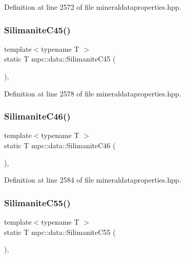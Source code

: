 Definition at line 2572 of file mineraldataproperties.\+hpp.

\mbox{\label{namespacempc_1_1data_a40198fd3de61005310799aee63c38616}} 
\subsubsection{\texorpdfstring{Silimanite\+C45()}{SilimaniteC45()}}
{\footnotesize\ttfamily template$<$typename T $>$ \\
static T mpc\+::data\+::\+Silimanite\+C45 (\begin{DoxyParamCaption}{ }\end{DoxyParamCaption})\hspace{0.3cm}{\ttfamily [inline]}, {\ttfamily [static]}}



Definition at line 2578 of file mineraldataproperties.\+hpp.

\mbox{\label{namespacempc_1_1data_a857d400c5c5f9baa73869447cc67ff3e}} 
\subsubsection{\texorpdfstring{Silimanite\+C46()}{SilimaniteC46()}}
{\footnotesize\ttfamily template$<$typename T $>$ \\
static T mpc\+::data\+::\+Silimanite\+C46 (\begin{DoxyParamCaption}{ }\end{DoxyParamCaption})\hspace{0.3cm}{\ttfamily [inline]}, {\ttfamily [static]}}



Definition at line 2584 of file mineraldataproperties.\+hpp.

\mbox{\label{namespacempc_1_1data_a0a67fbd28a4e06e24278ceb0f1762e27}} 
\subsubsection{\texorpdfstring{Silimanite\+C55()}{SilimaniteC55()}}
{\footnotesize\ttfamily template$<$typename T $>$ \\
static T mpc\+::data\+::\+Silimanite\+C55 (\begin{DoxyParamCaption}{ }\end{DoxyParamCaption})\hspace{0.3cm}{\ttfamily [inline]}, {\ttfamily [static]}}



